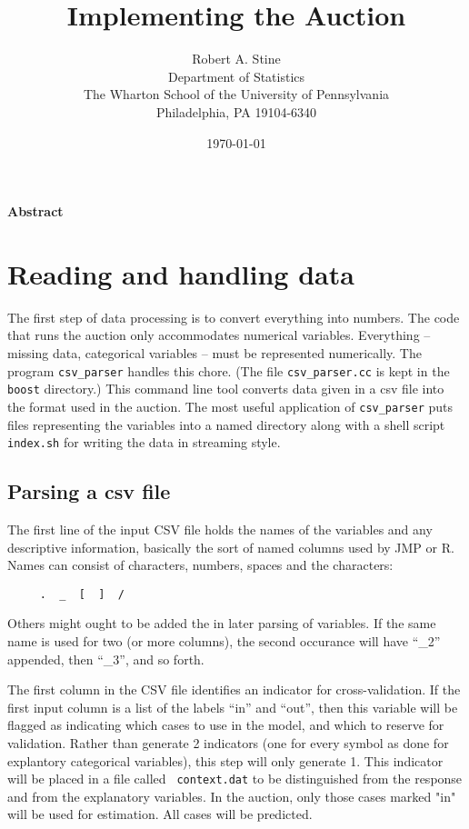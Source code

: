 \documentclass[12pt]{article}
\title{  
         Implementing the Auction
}
\author{
        Robert A. Stine                                      \\
        Department of Statistics                             \\
        The Wharton School of the University of Pennsylvania \\
        Philadelphia, PA 19104-6340                          \\
}
\date{\today}
\begin{document}
\maketitle 

\vspace{-0.5in} \centerline{\bf Abstract} 

\clearpage

\section*{Reading and handling data}  %

 The first step of data processing is to convert everything into numbers.  The
 code that runs the auction only accommodates numerical variables.  Everything
 -- missing data, categorical variables -- must be represented numerically.  The
 program {\tt csv\_parser} handles this chore.  (The file {\tt csv\_parser.cc}
 is kept in the {\tt boost} directory.)  This command line tool converts data
 given in a csv file into the format used in the auction.  The most useful
 application of {\tt csv\_parser} puts files representing the variables into a
 named directory along with a shell script {\tt index.sh} for writing the data
 in streaming style.


\subsection*{Parsing a csv file}

 The first line of the input CSV file holds the names of the variables and any
 descriptive information, basically the sort of named columns used by JMP or R.
  Names can consist of characters, numbers, spaces and the characters:
  \begin{verbatim} 
     .  _  [  ]  /  
  \end{verbatim}
 Others might ought to be added the in later parsing of variables.  If the same
 name is used for two (or more columns), the second occurance will have ``\_2''
 appended, then ``\_3'', and so forth.

 The first column in the CSV file identifies an indicator for cross-validation.
  If the first input column is a list of the labels ``in'' and ``out'', then
 this variable will be flagged as indicating which cases to use in the model,
 and which to reserve for validation.  Rather than generate 2 indicators (one
 for every symbol as done for explantory categorical variables), this step will
 only generate 1.  This indicator will be placed in a file called {\tt
 context.dat} to be distinguished from the response and from the explanatory
 variables.  In the auction, only those cases marked "in" will be used for
 estimation.  All cases will be predicted.
\end{document}
